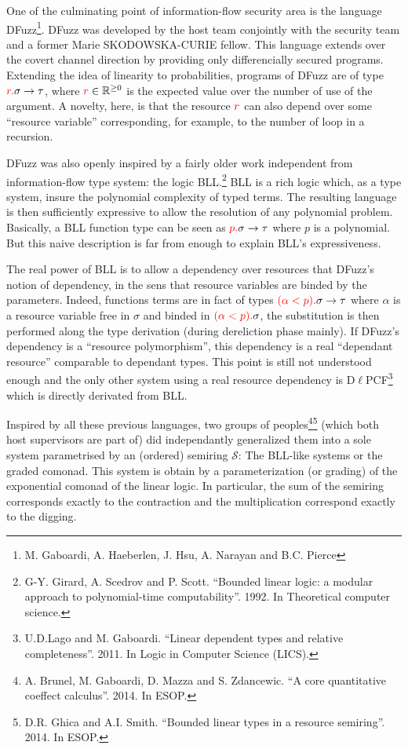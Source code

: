 \documentclass{article}[11pt]
\newcommand\sS{\mathcal S}
\begin{document}
One of the culminating point of information-flow security area is the language DFuzz\footnote{M. Gaboardi, A. Haeberlen, J. Hsu, A. Narayan and B.C. Pierce}. DFuzz was developed by the host team conjointly with the security team and a former Marie SKODOWSKA-CURIE fellow. This language extends over the covert channel direction by providing only differencially secured programs. Extending the idea of linearity to probabilities, programs of DFuzz are of type ${\color{red}r.}\sigma\rightarrow \tau$, where ${\color{red}r}\in \mathbb{R}^{\ge 0}$ is the expected value over the number of use of the argument. A novelty, here, is that the resource ${\color{red}r}$ can also depend over some ``resource variable'' corresponding, for example, to the number of loop in a recursion.

DFuzz was also openly inspired by a fairly older work independent from information-flow type system: the logic BLL.\footnote{G-Y. Girard, A. Scedrov and P. Scott. ``Bounded linear logic: a modular approach to polynomial-time computability''. 1992. In Theoretical computer science.} BLL is a rich logic which, as a type system, insure the polynomial complexity of typed terms. The resulting language is then sufficiently expressive to allow the resolution of any polynomial problem. Basically, a BLL function type can be seen as  ${\color{red}p.}\sigma\rightarrow \tau$ where $p$ is a polynomial. But this naive description is far from enough to explain BLL's expressiveness.

The real power of BLL is to allow a dependency over resources that DFuzz's notion of dependency, in the sens that resource variables are binded by the parameters. Indeed, functions terms are in fact of types ${\color{red}(\alpha<p).}\sigma\rightarrow \tau$ where $\alpha$ is a resource variable free in $\sigma$ and binded in ${\color{red}(\alpha<p).}\sigma$, the substitution is then performed along the type derivation (during dereliction phase mainly). If DFuzz's dependency is a ``resource polymorphism'', this dependency is a real ``dependant resource'' comparable to dependant types. This point is still not understood enough and the only other system using a real resource dependency is D$\ell$PCF\footnote{U.D.Lago and M. Gaboardi. ``Linear dependent types and relative completeness''. 2011. In Logic in Computer Science (LICS).} which is directly derivated from BLL.

Inspired by all these previous languages, two groups of peoples\footnote{A. Brunel, M. Gaboardi, D. Mazza and S. Zdancewic. ``A core quantitative coeffect calculus''. 2014. In ESOP.}\footnote{D.R. Ghica and A.I. Smith. ``Bounded linear types in a resource semiring''. 2014. In ESOP.} (which both host supervisors are part of) did independantly generalized them into a sole system parametrised by an (ordered) semiring $\sS$: The BLL-like systems or the graded comonad.  This system is obtain by a parameterization (or grading) of the exponential comonad of the linear logic. In particular, the sum of the semiring corresponds exactly to the contraction and the multiplication correspond exactly to the digging. 
\end{document}
